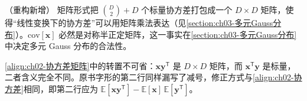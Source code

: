 \documentclass[../../main.tex]{subfiles}
\begin{document}
\begin{remark}（重构新增）
矩阵形式把 $\binom{D}{2}+D$ 个标量协方差打包成一个 $D\times D$ 矩阵，使得“线性变换下的协方差”可以用矩阵乘法表达（见\cref{section:ch03-多元Gauss分布}）。$\mathrm{cov}[\mathbf{x}]$ 必然是对称半正定矩阵，这一事实在\cref{section:ch03-多元Gauss分布}中决定多元 Gauss 分布的合法性。

\eqref{align:ch02-协方差矩阵}中的转置不可省：$\mathbf{x}\mathbf{y}^{\mathsf{T}}$ 是 $D\times D$ 矩阵，而 $\mathbf{x}^{\mathsf{T}}\mathbf{y}$ 是标量，二者含义完全不同。原书字形的第二行同样漏写了减号，修正方式与\eqref{align:ch02-协方差}相同，即第二行应为 $\mathbb{E}[\mathbf{x}\mathbf{y}^{\mathsf{T}}]-\mathbb{E}[\mathbf{x}]\,\mathbb{E}[\mathbf{y}^{\mathsf{T}}]$。
\end{remark}
\end{document}
